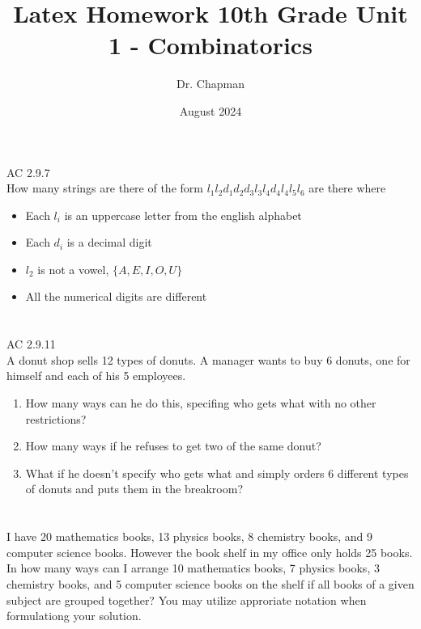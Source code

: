 \documentclass{article}
\title{Latex Homework 10th Grade Unit 1 - Combinatorics}
\author{Dr. Chapman}
\date{August 2024}
\begin{document}
\maketitle

\section{}
AC 2.9.7\\
How many strings are there of the form $l_1l_2d_1d_2d_3l_3l_4d_4l_4l_5l_6$ are there where
\begin{itemize}
  \item Each $l_i$ is an uppercase letter from the english alphabet
  \item Each $d_i$ is a decimal digit
  \item $l_2$ is not a vowel, $\{A, E, I, O, U\}$
  \item All the numerical digits are different
\end{itemize}
\section{}
AC 2.9.11\\
A donut shop sells 12 types of donuts. A manager wants to buy 6 donuts, one for himself and each of his 5 employees.
\begin{enumerate}
    \item How many ways can he do this, specifing who gets what with no other restrictions?
    \item How many ways if he refuses to get two of the same donut?
    \item What if he doesn't specify who gets what and simply orders 6 different types of donuts and puts them in the breakroom?
\end{enumerate}
\section{}
I have 20 mathematics books, 13 physics books, 8 chemistry books, and 9 computer science books. However the book shelf in my office only holds 25 books. In how many ways can I arrange 10 mathematics books, 7 physics books, 3 chemistry books, and 5 computer science books on the shelf if all books of a given subject are grouped together? You may utilize approriate notation when formulationg your solution.
\end{document}
